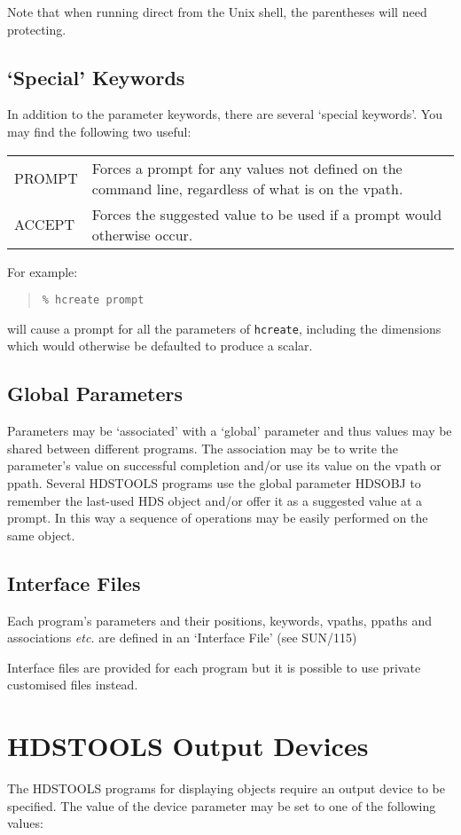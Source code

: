 \documentclass[twoside,11pt]{article}
\newcommand{\latex}[1]{#1}
\newcommand{\xref}[3]{#1}
\renewcommand{\_}{\texttt{\symbol{95}}}
\begin{document}
Note that when running direct from the Unix shell, the parentheses will need
protecting.

\subsection{`Special' Keywords}
In addition to the parameter keywords, there are several `special keywords'.
You may find the following two useful:

\begin{tabular}[t]{p{0.8in}p{5in}}
PROMPT & Forces a prompt for any values not defined on the command
line, regardless of what is on the vpath. \\
ACCEPT & Forces the suggested value to be used if a prompt would
otherwise occur.
\end{tabular}

For example:
\begin{quote}
\texttt{\% hcreate prompt}
\end{quote}
will cause a prompt for all the parameters of \texttt{hcreate}, including
the dimensions which would otherwise be defaulted to produce a scalar.

\subsection{Global Parameters}
Parameters may be `associated' with a `global' parameter and thus values
may be shared between different programs. The association may be to write the
parameter's value on successful completion and/or use its value on the vpath
or ppath. Several HDSTOOLS programs use the global parameter HDSOBJ to
remember the last-used HDS object and/or offer it as a suggested value at a
prompt. In this way a sequence of operations may be easily performed on the
same object.

\subsection{Interface Files}
Each program's parameters and their positions, keywords, vpaths, ppaths and
associations \textit{etc.} are defined in an 
\xref{`Interface File'}{sun115}{}\latex{ (see SUN/115)}

Interface files are provided for each program but it is possible to use
private customised files instead.

\section{\label{hdstools_output_devices}HDSTOOLS Output Devices}
The HDSTOOLS programs for displaying objects require an output device to be
specified.
The value of the device parameter may be set to one of the following values:
\end{document}
